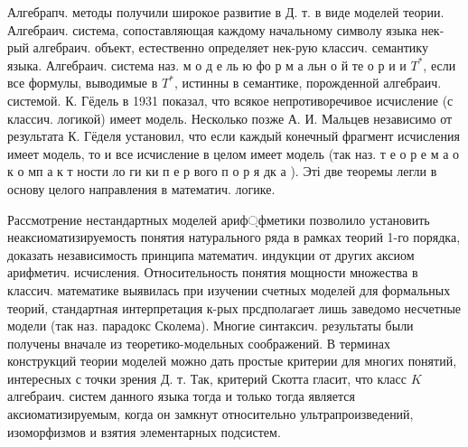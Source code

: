 \documentclass[10pt]{article}
\begin{document}
Алгебрапч. методы получили широкое развитие в Д. т. в виде моделей теории. Алгебраич. система, сопоставляющая каждому начальному символу языка нек-рый алгебраич. объект, естественно определяет нек-рую классич. семантику языка. Алгебраич. система наз. м о д е ль ю фо р м а льн о й те о р и и $T^{*}$, если все формулы, выводимые в $T^{*}$, истинны в семантике, порожденной алгебраич. системой. К. Гёдель в 1931 показал, что всякое непротиворечивое исчисление (с классич. логикой) имеет модель. Несколько позже А. И. Мальцев независимо от результата К. Гёделя установил, что если каждый конечный фрагмент исчисления имеет модель, то и все исчисление в целом имеет модель (так наз. т е о р е м а о к о мп а к т ности ло ги ки п е р вого п о р я дк а ). Эті две теоремы легли в основу целого направления в математич. логике.



Рассмотрение нестандартных моделей ариф্фметики позволило установить неаксиоматизируемость понятия натурального ряда в рамках теорий 1-го порядка, доказать независимость принципа математич. индукции от других аксиом арифметич. исчисления. Относительность понятия мощности множества в классич. математике выявилась при изучении счетных моделей для формальных теорий, стандартная интерпретация к-рых прсдполагает лишь заведомо несчетные модели (так наз. парадокс Сколема). Многие синтаксич. результаты были получены вначале из теоретико-модельных соображений. В терминах конструкций теории моделей можно дать простые критерии для многих понятий, интересных с точки зрения Д. т. Так, критерий Скотта гласит, что класс $K$ алгебраич. систем данного языка тогда и только тогда является аксиоматизируемым, когда он замкнут относительно ультрапроизведений, изоморфизмов и взятия элементарных подсистем.
\end{document}
